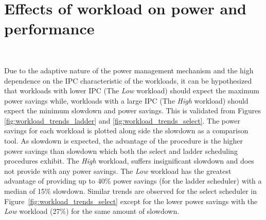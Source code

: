 \section{Effects of workload on power and performance}~\label{sec:wrk_trends}

Due to the adaptive nature of the power management mechanism and the high dependence
on the IPC characteristic of the workloads, it can be hypothesized
that workloads with lower IPC (The \textit{Low} workload) should expect the maximum
power savings while, workloads with a large IPC (The \textit{High} workload) should
expect the minimum slowdown and power savings. This is validated from Figures \ref{fig:workload_trends_ladder}
and \ref{fig:workload_trends_select}. The power savings for each workload is plotted
along side the slowdown as a comparison tool. As slowdown is expected, the advantage of the procedure
is the higher power savings than slowdown which both the select and ladder scheduling
procedures exhibit. The \textit{High} workload, suffers insignificant slowdown and 
does not provide with any power savings. The \textit{Low} workload has the greatest advantage
of providing up to 40\% power savings (for the ladder scheduler) with a median of 15\% slowdown.
Similar trends are observed for the select scheduler in Figure~\ref{fig:workload_trends_select} 
except for the lower power savings with the \textit{Low} workload (27\%) for the same amount of 
slowdown.

